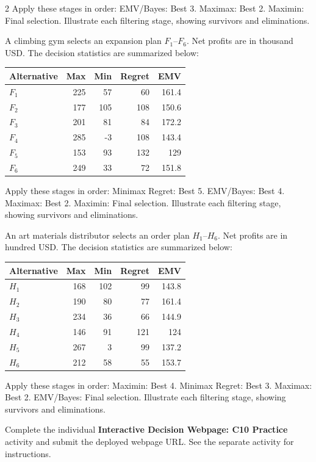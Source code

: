 \begin{multicols}{2}
\noindent Apply these stages in order: EMV/Bayes: Best 3. Maximax: Best 2. Maximin: Final selection.
Illustrate each filtering stage, showing survivors and eliminations.

A climbing gym selects an expansion plan $F_1$--$F_6$. Net profits are in thousand USD. The decision statistics are summarized below:
\vspace{-4mm}
\begin{center}\small\setlength{\tabcolsep}{4pt}
	\begin{tabular}{lrrrr}\toprule
		Alternative & Max & Min & Regret & EMV\\ \midrule
		$F_1$ & 225 & 57 & 60 & 161.4\\
		$F_2$ & 177 & 105 & 108 & 150.6\\
		$F_3$ & 201 & 81 & 84 & 172.2\\
		$F_4$ & 285 & -3 & 108 & 143.4\\
		$F_5$ & 153 & 93 & 132 & 129\\
		$F_6$ & 249 & 33 & 72 & 151.8\\
		\bottomrule
	\end{tabular}
\end{center}
\vspace{-3mm}
\noindent Apply these stages in order: Minimax Regret: Best 5. EMV/Bayes: Best 4. Maximax: Best 2. Maximin: Final selection.
Illustrate each filtering stage, showing survivors and eliminations.

An art materials distributor selects an order plan $H_1$--$H_6$. Net profits are in hundred USD. The decision statistics are summarized below:
\vspace{-3mm}
\begin{center}\small\setlength{\tabcolsep}{4pt}
	\begin{tabular}{lrrrr}\toprule
		Alternative & Max & Min & Regret & EMV\\ \midrule
		$H_1$ & 168 & 102 & 99 & 143.8\\
		$H_2$ & 190 & 80 & 77 & 161.4\\
		$H_3$ & 234 & 36 & 66 & 144.9\\
		$H_4$ & 146 & 91 & 121 & 124\\
		$H_5$ & 267 & 3 & 99 & 137.2\\
		$H_6$ & 212 & 58 & 55 & 153.7\\
		\bottomrule
	\end{tabular}
\end{center}
\vspace{-3mm}
\noindent Apply these stages in order: Maximin: Best 4. Minimax Regret: Best 3. Maximax: Best 2. EMV/Bayes: Final selection.
Illustrate each filtering stage, showing survivors and eliminations.

\par
{}
		Complete the individual \textbf{Interactive Decision Webpage: C10 Practice} activity and submit the deployed webpage URL. See the separate activity for instructions.
		
	\end{multicols}

